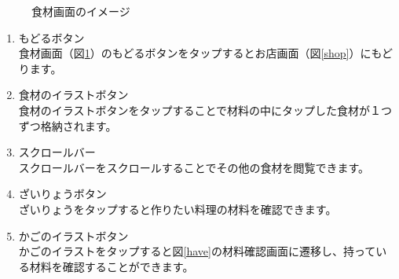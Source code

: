 \documentclass[a4j]{jarticle}
\begin{document}
\begin{figure}[H]
    \begin{center}
    \caption {食材画面のイメージ}
    \label{shop_material}
    \end{center}
\end{figure}

\begin{enumerate}
  \renewcommand{\labelenumi}{\textcircled{\scriptsize \theenumi}}
\item もどるボタン\\
  食材画面（図\ref{shop_material}）のもどるボタンをタップするとお店画面（図\ref{shop}）にもどります。
\item 食材のイラストボタン\\
  食材のイラストボタンをタップすることで材料の中にタップした食材が１つずつ格納されます。
\item スクロールバー\\
  スクロールバーをスクロールすることでその他の食材を閲覧できます。
\item ざいりょうボタン\\
  ざいりょうをタップすると作りたい料理の材料を確認できます。
\item かごのイラストボタン\\
  かごのイラストをタップすると図\ref{have}の材料確認画面に遷移し、持っている材料を確認することができます。
\end{enumerate}
\end{document}
